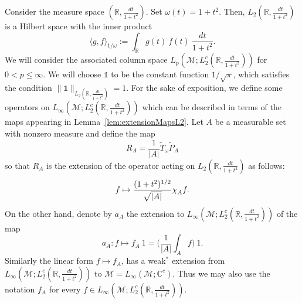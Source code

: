 \documentclass[psamsfonts]{amsart}
\newtheorem{lemma}[theorem]{Lemma}
\newcommand*{\bigchi}{\mbox{\large$\chi$}}
\newcommand{\Lp}{L_p}
\newcommand{\Linfty}{L_\infty}
\newcommand{\Ltwo}{L_2}
\newcommand{\Ltwoc}{L_2^c}
\newcommand{\Ltwot}{L_2^t}
\newcommand{\Tw}{\widetilde{T}_\omega}
\begin{document}
    Consider the measure space $(\mathbb{R}, \frac{dt}{1+t^2})$. Set $\omega(t) = 1+t^2$. Then, $\Ltwo(\mathbb{R},\frac{dt}{1+t^2})$ is a Hilbert space with the inner product
   $$        \langle g, f \rangle_{1/\omega} := \int_{\mathbb{R}} \overline{g(t)} \ f(t) \ \frac{dt}{1+t^2}.$$
    We will consider the associated column space $\Lp(\mathcal{M};\Ltwoc(\mathbb{R},\frac{dt}{1+t^2}))$ for $0 < p \leq \infty$. We will choose $\mathds{1}$ to be the constant function $1/\sqrt{\pi}$, which satisfies the condition $\| \mathds{1}\|_{\Ltwo(\mathbb{R},\frac{dt}{1+t^2})} = 1$. For the sake of exposition, we define some operators on $\Linfty(\mathcal{M};\Ltwoc(\mathbb{R},\frac{dt}{1+t^2}))$ which can be described in terms of the maps appearing in Lemma~\ref{lem:extensionMapsL2}. Let $A$ be a measurable set with nonzero measure and define the map
   $$        R_A = \frac 1{|A|}\Tw  \widetilde{P}_A$$
    so that $R_A$ is the extension of the operator acting on $\Ltwo(\mathbb{R},\frac{dt}{1+t^2})$ as follows:
  $$
        f \mapsto \frac{(1+t^2)^{1/2}}{\sqrt{|A|}} \bigchi_A f.$$
    On the other hand, denote by $a_A$ the extension to $\Linfty(\mathcal{M};\Ltwoc(\mathbb{R},\frac{dt}{1+t^2}))$ of the map
   $$        a_A : f \mapsto f_A \ 1 = \Big(\frac{1}{|A|} \int_A f \Big) \ 1.$$
    Similarly the linear form $f\mapsto f_A$, has a weak$^*$ extension
    from $\Linfty(\mathcal{M};\Ltwoc(\mathbb{R},\frac{dt}{1+t^2}))$ to
    $\mathcal M= L_\infty(\mathcal M; \mathbb C^c)$. Thus we may also use the notation $f_A$ for every $f\in \Linfty(\mathcal{M};\Ltwoc(\mathbb{R},\frac{dt}{1+t^2}))$. 
\end{document}
